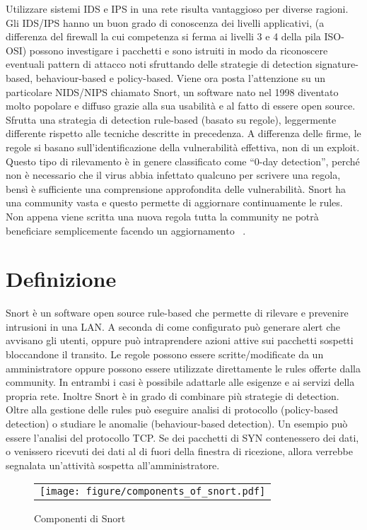 Utilizzare sistemi IDS e IPS in una rete risulta vantaggioso per diverse ragioni. Gli IDS/IPS hanno un buon grado di conoscenza dei livelli applicativi, (a differenza del firewall la cui competenza si ferma ai livelli 3 e 4 della pila ISO-OSI) possono investigare i pacchetti e sono istruiti in modo da riconoscere eventuali pattern di attacco noti sfruttando delle strategie di detection signature-based, behaviour-based e policy-based.
Viene ora posta l'attenzione su un particolare NIDS/NIPS chiamato Snort, un software nato nel 1998 diventato molto popolare e diffuso grazie alla sua usabilità e al fatto di essere open source. Sfrutta una strategia di detection rule-based (basato su regole), leggermente differente rispetto alle tecniche descritte in precedenza. A differenza delle firme, le regole si basano sull'identificazione della vulnerabilità effettiva, non di un exploit. Questo tipo di rilevamento è in genere classificato come ``0-day detection'', perché non è necessario che il virus abbia infettato qualcuno per scrivere una regola, bensì è sufficiente una comprensione approfondita delle vulnerabilità. Snort ha una community vasta e questo permette di aggiornare continuamente le rules. Non appena viene scritta una nuova regola tutta la community ne potrà beneficiare semplicemente facendo un aggiornamento ~\cite{snort}.

\section{Definizione}

Snort è un software open source rule-based che permette di rilevare e prevenire intrusioni in una LAN. A seconda di come configurato può generare alert che avvisano gli utenti, oppure può intraprendere azioni attive sui pacchetti sospetti bloccandone il transito. Le regole possono essere scritte/modificate da un amministratore oppure possono essere utilizzate direttamente le rules offerte dalla community. In entrambi i casi è possibile adattarle alle esigenze e ai servizi della propria rete. Inoltre Snort è in grado di combinare più strategie di detection. Oltre alla gestione delle rules può eseguire analisi di protocollo (policy-based detection) o studiare le anomalie (behaviour-based detection). Un esempio può essere l'analisi del protocollo TCP. Se dei pacchetti di SYN contenessero dei dati, o venissero ricevuti dei dati al di fuori della finestra di ricezione, allora verrebbe segnalata un'attività sospetta all'amministratore.

\begin{figure}[h]
    \begin{center}
        \begin{tabular}{l}
            \texttt{[image: figure/components\_of\_snort.pdf]}
        \end{tabular}
    \end{center}
    \caption{Componenti di Snort}
\end{figure}

